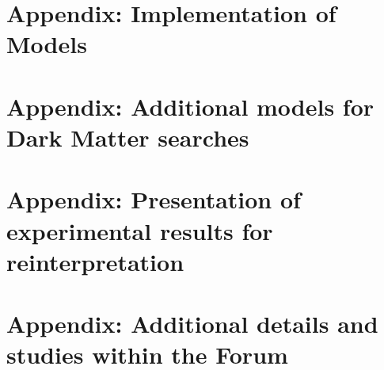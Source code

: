 \documentclass[a4paper,debug,notitlepage,nobib]{tufte-book}
\begin{document}
\appendix

%

\chapter{Appendix: Implementation of Models}
\label{app:MonojetLikeModels_Appendix}


\chapter{Appendix: Additional models for Dark Matter searches}
\label{app:EWSpecificModels_Appendix}


\chapter{Appendix: Presentation of experimental results for reinterpretation}
\label{app:Presentation_Of_Experimental_Results}


\chapter{Appendix: Additional details and studies within the Forum}
\label{app:Additional_details}


% 

%

\end{document}
